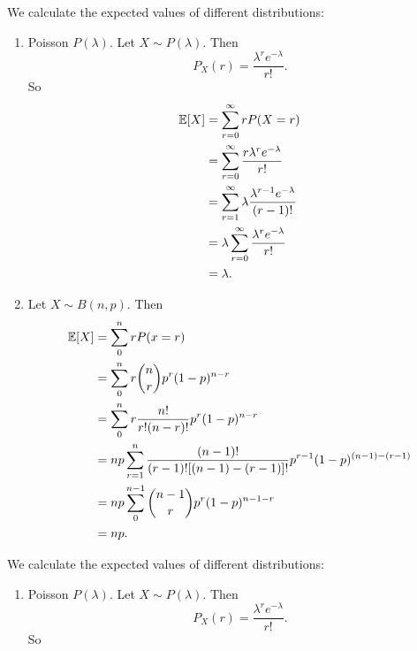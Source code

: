 \begin{note}
  \begin{field}
    \begin{eg}
      We calculate the expected values of different distributions:
      \begin{enumerate}
        \item Poisson $P(\lambda)$. Let $X\sim P(\lambda)$. Then
          \[
            P_X(r) = \frac{\lambda^r e^{-\lambda}}{r!}.
          \]
          So
          \begin{align*}
            \mathbb{E}[X] &= \sum_{r = 0}^\infty rP(X = r)\\
            &= \sum_{r = 0}^\infty \frac{r \lambda^r e^{-\lambda}}{r!}\\
            &= \sum_{r = 1}^\infty \lambda \frac{\lambda^{r - 1}e^{-\lambda}}{(r - 1)!}\\
            &= \lambda\sum_{r = 0}^\infty\frac{\lambda^r e^{-\lambda}}{r!}\\
            &= \lambda.
          \end{align*}
        \item Let $X\sim B(n, p)$. Then
          \begin{align*}
            \mathbb{E}[X] &= \sum_0^n rP(x = r)\\
            &= \sum_0^n r\binom{n}{r} p^r(1 - p)^{n - r}\\
            &= \sum_0^n r\frac{n!}{r!(n - r)!}p^r (1 - p)^{n - r}\\
            &= np\sum_{r = 1}^n \frac{(n - 1)!}{(r - 1)![(n - 1) - (r - 1)]!}p^{r - 1}(1 - p)^{(n - 1) - (r - 1)}\\
            &= np\sum_{0}^{n - 1}\binom{n - 1}{r}p^r(1 - p)^{n - 1 - r}\\
            &= np.
          \end{align*}
      \end{enumerate}
    \end{eg}
  \end{field}
  \begin{field}
    \begin{eg}
      We calculate the expected values of different distributions:
      \begin{enumerate}
        \item Poisson $P(\lambda)$. Let $X\sim P(\lambda)$. Then
          \[
            P_X(r) = \frac{\lambda^r e^{-\lambda}}{r!}.
          \]
          So
          \begin{align*}

\end{align*}
\end{enumerate}
\end{eg}
\end{field}
\end{note}
